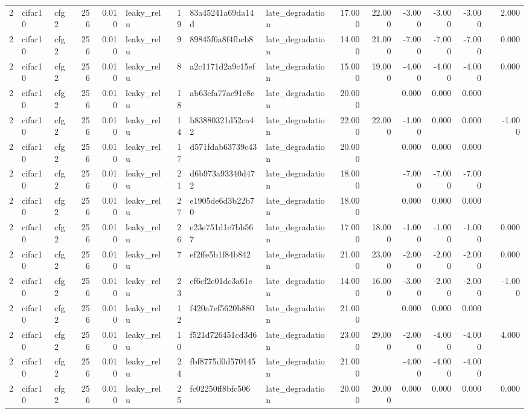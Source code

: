 \begin{table}[htbp]
{\begin{tabular}{@{}rllrrlrllrrrrrrr@{}}
2 & cifar10 & cfg2 & 256 & 0.010 & leaky\_relu & 19 & 83a45241a69da14d & late\_degradation & 17.000 & 22.000 & -3.000 & -3.000 & -3.000 &  & 2.000 \\
2 & cifar10 & cfg2 & 256 & 0.010 & leaky\_relu & 9 & 89845f6a8f4fbcb8 & late\_degradation & 14.000 & 21.000 & -7.000 & -7.000 & -7.000 &  & 0.000 \\
2 & cifar10 & cfg2 & 256 & 0.010 & leaky\_relu & 8 & a2c1171d2a9c15ef & late\_degradation & 15.000 & 19.000 & -4.000 & -4.000 & -4.000 &  & 0.000 \\
2 & cifar10 & cfg2 & 256 & 0.010 & leaky\_relu & 18 & ab63efa77ac91c8e & late\_degradation & 20.000 &  & 0.000 & 0.000 & 0.000 &  &  \\
2 & cifar10 & cfg2 & 256 & 0.010 & leaky\_relu & 14 & b83880321d52ca42 & late\_degradation & 22.000 & 22.000 & -1.000 & 0.000 & 0.000 &  & -1.000 \\
2 & cifar10 & cfg2 & 256 & 0.010 & leaky\_relu & 17 & d571fdab63739c43 & late\_degradation & 20.000 &  & 0.000 & 0.000 & 0.000 &  &  \\
2 & cifar10 & cfg2 & 256 & 0.010 & leaky\_relu & 21 & d6b973a93340d472 & late\_degradation & 18.000 &  & -7.000 & -7.000 & -7.000 &  &  \\
2 & cifar10 & cfg2 & 256 & 0.010 & leaky\_relu & 27 & e1905de6d3b22b70 & late\_degradation & 18.000 &  & 0.000 & 0.000 & 0.000 &  &  \\
2 & cifar10 & cfg2 & 256 & 0.010 & leaky\_relu & 26 & e23e751d1e7bb567 & late\_degradation & 17.000 & 18.000 & -1.000 & -1.000 & -1.000 &  & 0.000 \\
2 & cifar10 & cfg2 & 256 & 0.010 & leaky\_relu & 7 & ef2ffe5b1f84b842 & late\_degradation & 21.000 & 23.000 & -2.000 & -2.000 & -2.000 &  & 0.000 \\
2 & cifar10 & cfg2 & 256 & 0.010 & leaky\_relu & 23 & ef6cf2e01dc3a61c & late\_degradation & 14.000 & 16.000 & -3.000 & -2.000 & -2.000 &  & -1.000 \\
2 & cifar10 & cfg2 & 256 & 0.010 & leaky\_relu & 12 & f420a7ef5620b880 & late\_degradation & 21.000 &  & 0.000 & 0.000 & 0.000 &  &  \\
2 & cifar10 & cfg2 & 256 & 0.010 & leaky\_relu & 10 & f521d726451cd3d6 & late\_degradation & 23.000 & 29.000 & -2.000 & -4.000 & -4.000 &  & 4.000 \\
2 & cifar10 & cfg2 & 256 & 0.010 & leaky\_relu & 24 & fbf8775d0d570145 & late\_degradation & 21.000 &  & -4.000 & -4.000 & -4.000 &  &  \\
2 & cifar10 & cfg2 & 256 & 0.010 & leaky\_relu & 25 & fc02250ff8bfc506 & late\_degradation & 20.000 & 20.000 & 0.000 & 0.000 & 0.000 &  & 0.000 \\

\end{tabular}}
\end{table}
